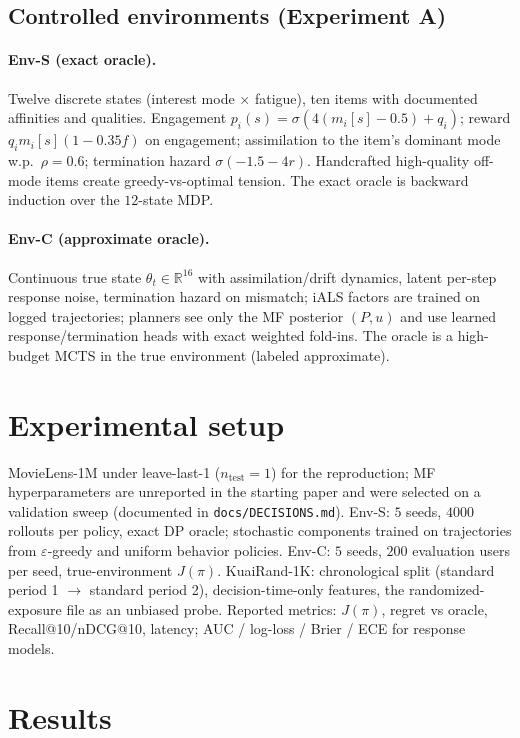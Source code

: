 \documentclass[11pt,a4paper]{article}
\newcommand{\J}{J(\pi)}
\begin{document}
\subsection{Controlled environments (Experiment A)}

\paragraph{Env-S (exact oracle).}
Twelve discrete states (interest mode $\times$ fatigue), ten items with documented
affinities and qualities. Engagement
$p_i(s) = \sigma(4(m_i[s] - 0.5) + q_i)$; reward $q_i m_i[s] (1 - 0.35 f)$ on engagement;
assimilation to the item's dominant mode w.p.\ $\rho = 0.6$; termination hazard
$\sigma(-1.5 - 4r)$. Handcrafted high-quality off-mode items create greedy-vs-optimal
tension. The exact oracle is backward induction over the $12$-state MDP.

\paragraph{Env-C (approximate oracle).}
Continuous true state $\theta_t \in \mathbb{R}^{16}$ with assimilation/drift dynamics,
latent per-step response noise, termination hazard on mismatch; iALS factors are trained
on logged trajectories; planners see only the MF posterior $(P, u)$ and use learned
response/termination heads with exact weighted fold-ins. The oracle is a high-budget
MCTS in the true environment (labeled approximate).

\section{Experimental setup}

MovieLens-1M under leave-last-1 ($n_{\text{test}}=1$) for the reproduction; MF
hyperparameters are unreported in the starting paper and were selected on a validation
sweep (documented in \texttt{docs/DECISIONS.md}). Env-S: $5$ seeds, $4000$ rollouts per
policy, exact DP oracle; stochastic components trained on trajectories from
$\varepsilon$-greedy and uniform behavior policies. Env-C: $5$ seeds, $200$ evaluation
users per seed, true-environment $\J$. KuaiRand-1K: chronological split (standard period
1 $\to$ standard period 2), decision-time-only features, the randomized-exposure file as
an unbiased probe. Reported metrics: $\J$, regret vs oracle, Recall@10/nDCG@10, latency;
AUC / log-loss / Brier / ECE for response models.

\section{Results}
\end{document}
